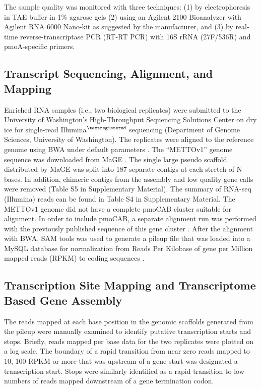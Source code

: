 The sample quality was monitored with three techniques: (1) by electrophoresis in TAE buffer in 1\% agarose gels (2) using an Agilent 2100 Bioanalyzer with Agilent RNA 6000 Nano-kit as suggested by the manufacturer, and (3) by real-time reverse-transcriptase PCR (RT-RT PCR) with 16S rRNA (27F/536R) and pmoA-specific \cite{auman2001} primers.

\subsection{Transcript Sequencing, Alignment, and Mapping}
Enriched RNA samples (i.e., two biological replicates) were submitted to the University of Washington’s High-Throughput Sequencing Solutions Center on dry ice for single-read Illumina$^{\textregistered}$ sequencing (Department of Genome Sciences, University of Washington).
The replicates were aligned to the reference genome using BWA under default parameters \cite{li2009}.
The “METTOv1” genome sequence was downloaded from MaGE \cite{vallenet2006}.
The single large pseudo scaffold distributed by MaGE was split into 187 separate contigs at each stretch of N bases.
In addition, chimeric contigs from the assembly and low quality gene calls were removed (Table S5 in Supplementary Material).
The summary of RNA-seq (Illumina) reads can be found in Table S4 in Supplementary Material.
The METTOv1 genome did not have a complete pmoCAB cluster suitable for alignment.
In order to include pmoCAB, a separate alignment run was performed with the previously published sequence of this gene cluster \cite{holmes1995}.
After the alignment with BWA, SAM tools was used to generate a pileup file that was loaded into a MySQL database for normalization from Reads Per Kilobase of gene per Million mapped reads (RPKM) to coding sequences \cite{mortazavi2008}.

\subsection{Transcription Site Mapping and Transcriptome Based Gene Assembly}
The reads mapped at each base position in the genomic scaffolds generated from the pileup were manually examined to identify putative transcription starts and stops.
Briefly, reads mapped per base data for the two replicates were plotted on a log scale.
The boundary of a rapid transition from near zero reads mapped to 10, 100 RPKM or more that was upstream of a gene start was designated a transcription start.
Stops were similarly identified as a rapid transition to low numbers of reads mapped downstream of a gene termination codon.

